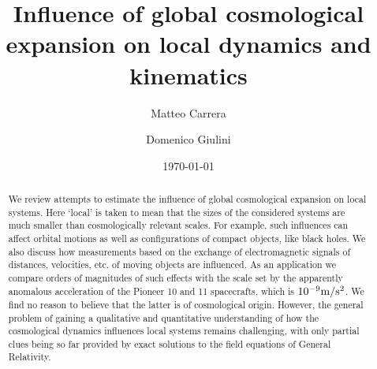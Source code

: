 \documentclass
[rmp,aps,twocolumn,showpacs,preprintnumbers,amsmath,amssymb]{revtex4}
\theoremstyle{plain}
\theoremstyle{definition}
\theoremstyle{remark}
\begin{document}


\title{Influence of global cosmological expansion 
       on local dynamics and kinematics}

\author{Matteo Carrera}
\author{Domenico Giulini}

\date{\today}

\begin{abstract}
We review attempts to estimate the influence of global cosmological
expansion on local systems. Here `local' is taken to mean that 
the sizes of the considered systems are much smaller than cosmologically 
relevant scales. For example, such influences can affect orbital 
motions as well as configurations of compact objects, like 
black holes. We also discuss how measurements based on the exchange of 
electromagnetic signals of distances, velocities, etc. of moving 
objects are influenced. As an application we compare orders of 
magnitudes of such effects with the scale set by the apparently 
anomalous acceleration of the Pioneer 10 and 11 spacecrafts, 
which is $10^{-9}{\rm m/s^2}$. We find no reason to believe that 
the latter is of cosmological origin. However, the general problem 
of gaining a qualitative and quantitative understanding of how 
the cosmological dynamics influences local systems remains 
challenging, with only partial clues being so far provided by 
exact solutions to the field equations of General Relativity. 
\end{abstract}

\end{document}
